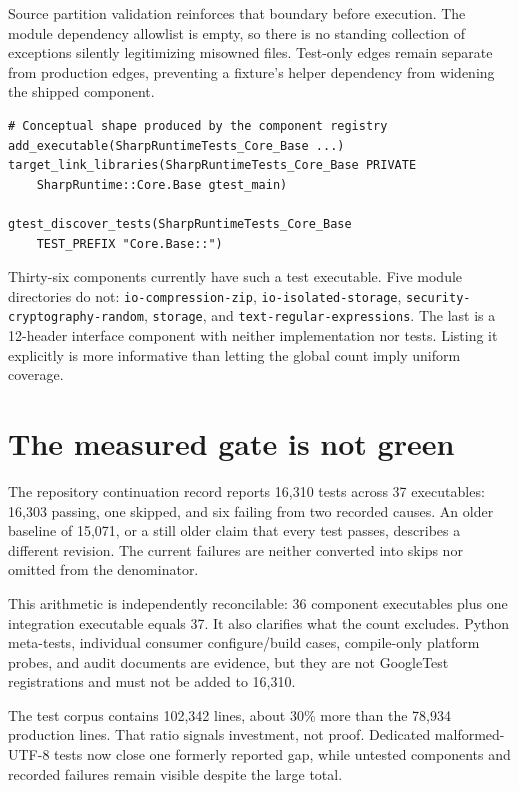 Source partition validation reinforces that boundary before execution. The module dependency
allowlist is empty, so there is no standing collection of exceptions silently legitimizing
misowned files. Test-only edges remain separate from production edges, preventing a fixture's
helper dependency from widening the shipped component.

\begin{lstlisting}
# Conceptual shape produced by the component registry
add_executable(SharpRuntimeTests_Core_Base ...)
target_link_libraries(SharpRuntimeTests_Core_Base PRIVATE
    SharpRuntime::Core.Base gtest_main)

gtest_discover_tests(SharpRuntimeTests_Core_Base
    TEST_PREFIX "Core.Base::")
\end{lstlisting}

Thirty-six components currently have such a test executable. Five module directories do not:
\texttt{io-compression-zip}, \texttt{io-isolated-storage},
\texttt{security-cryptography-random}, \texttt{storage}, and
\texttt{text-regular-expressions}. The last is a 12-header interface component with neither
implementation nor tests. Listing it explicitly is more informative than letting the global
count imply uniform coverage.

\section{The measured gate is not green}

The repository continuation record reports 16{,}310 tests across 37 executables:
16{,}303 passing, one skipped, and six failing from two recorded causes. An older baseline of
15{,}071, or a still older claim that every test passes, describes a different revision.
The current failures are neither converted into skips nor omitted from the denominator.

This arithmetic is independently reconcilable: 36 component executables plus one integration
executable equals 37. It also clarifies what the count excludes. Python meta-tests, individual
consumer configure/build cases, compile-only platform probes, and audit documents are evidence,
but they are not GoogleTest registrations and must not be added to 16{,}310.

The test corpus contains 102{,}342 lines, about 30\% more than the 78{,}934 production lines.
That ratio signals investment, not proof. Dedicated malformed-UTF-8 tests now close one formerly
reported gap, while untested components and recorded failures remain visible despite the large
total.

